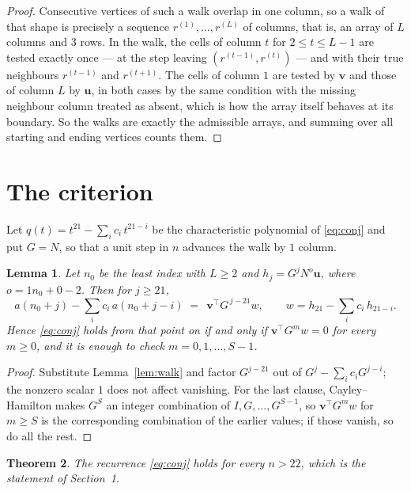 \documentclass[11pt,a4paper]{article}
\theoremstyle{plain}
\newtheorem{theorem}{Theorem}
\newtheorem{lemma}[theorem]{Lemma}
\theoremstyle{definition}
\begin{document}
\begin{proof}
Consecutive vertices of such a walk overlap in one column, so a walk of that shape is
precisely a sequence $r^{(1)},\dots,r^{(L)}$ of columns, that is, an array of $L$ columns
and $3$ rows. In the walk, the cells of column $t$ for $2\le t\le L-1$ are tested
exactly once --- at the step leaving $(r^{(t-1)},r^{(t)})$ --- and with their true
neighbours $r^{(t-1)}$ and $r^{(t+1)}$. The cells of column $1$ are tested by
$\mathbf{v}$ and those of column $L$ by $\mathbf{u}$, in both cases by the same condition
with the missing neighbour column treated as absent, which is how the array itself behaves at
its boundary. So the walks are exactly the admissible arrays, and summing over all starting
and ending vertices counts them.
\end{proof}

\section{The criterion}

Let $q(t)=t^{21}-\sum_i c_i\,t^{21-i}$ be the characteristic polynomial of
\eqref{eq:conj} and put $G=N$, so that a unit step in $n$ advances the walk by
$1$ column.

\begin{lemma}\label{lem:crit}
Let $n_0$ be the least index with $L\ge2$ and $h_j=G^{j}N^{o}\mathbf{u}$, where
$o=1n_0+0-2$. Then for $j\ge21$,
\[
a(n_0+j)-\sum_i c_i\,a(n_0+j-i)\;=\;\,\mathbf{v}^{\!\top}G^{\,j-21}w,
\qquad w=h_{21}-\sum_i c_i\,h_{21-i} .
\]
Hence \eqref{eq:conj} holds from that point on if and only if
$\mathbf{v}^{\!\top}G^{m}w=0$ for every $m\ge0$, and it is enough to check
$m=0,1,\dots,S-1$.
\end{lemma}

\begin{proof}
Substitute Lemma~\ref{lem:walk} and factor $G^{j-21}$ out of
$G^{j}-\sum_ic_iG^{j-i}$; the nonzero scalar $1$ does not affect
vanishing. For the last clause, Cayley--Hamilton makes $G^{S}$ an integer combination of
$I,G,\dots,G^{S-1}$, so $\mathbf{v}^{\!\top}G^{m}w$ for $m\ge S$ is the corresponding
combination of the earlier values; if those vanish, so do all the rest.
\end{proof}

\begin{theorem}
The recurrence \eqref{eq:conj} holds for every $n>22$, which is the statement of
Section~1.
\end{theorem}
\end{document}

